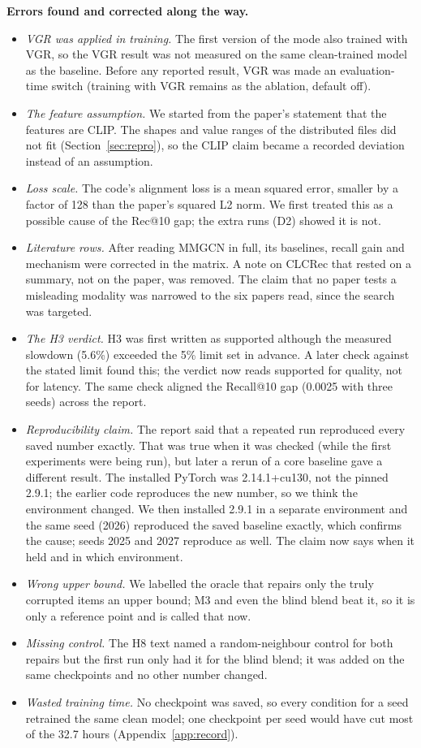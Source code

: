 \documentclass[conference]{IEEEtran}
\newcommand{\code}[1]{\texttt{\detokenize{#1}}}
\begin{document}
\textbf{Errors found and corrected along the way.}
\begin{itemize}
\item \emph{VGR was applied in training.} The first version of the \code{improved} mode also trained with VGR, so the VGR result was not measured on the same clean-trained model as the baseline. Before any reported result, VGR was made an evaluation-time switch (training with VGR remains as the \code{--train_with_vgr} ablation, default off).
\item \emph{The feature assumption.} We started from the paper's statement that the features are CLIP. The shapes and value ranges of the distributed files did not fit (Section~\ref{sec:repro}), so the CLIP claim became a recorded deviation instead of an assumption.
\item \emph{Loss scale.} The code's alignment loss is a mean squared error, smaller by a factor of 128 than the paper's squared L2 norm. We first treated this as a possible cause of the Rec@10 gap; the extra runs (D2) showed it is not.
\item \emph{Literature rows.} After reading MMGCN in full, its baselines, recall gain and mechanism were corrected in the matrix. A note on CLCRec that rested on a summary, not on the paper, was removed. The claim that no paper tests a misleading modality was narrowed to the six papers read, since the search was targeted.
\item \emph{The H3 verdict.} H3 was first written as supported although the measured slowdown (5.6\%) exceeded the 5\% limit set in advance. A later check against the stated limit found this; the verdict now reads supported for quality, not for latency. The same check aligned the Recall@10 gap (0.0025 with three seeds) across the report.
\item \emph{Reproducibility claim.} The report said that a repeated run reproduced every saved number exactly. That was true when it was checked (while the first experiments were being run), but later a rerun of a core baseline gave a different result. The installed PyTorch was 2.14.1+cu130, not the pinned 2.9.1; the earlier code reproduces the new number, so we think the environment changed. We then installed 2.9.1 in a separate environment and the same seed (2026) reproduced the saved baseline exactly, which confirms the cause; seeds 2025 and 2027 reproduce as well. The claim now says when it held and in which environment.
\item \emph{Wrong upper bound.} We labelled the oracle that repairs only the truly corrupted items an upper bound; M3 and even the blind blend beat it, so it is only a reference point and is called that now.
\item \emph{Missing control.} The H8 text named a random-neighbour control for both repairs but the first run only had it for the blind blend; it was added on the same checkpoints and no other number changed.
\item \emph{Wasted training time.} No checkpoint was saved, so every condition for a seed retrained the same clean model; one checkpoint per seed would have cut most of the 32.7 hours (Appendix~\ref{app:record}).
\end{itemize}
\end{document}
